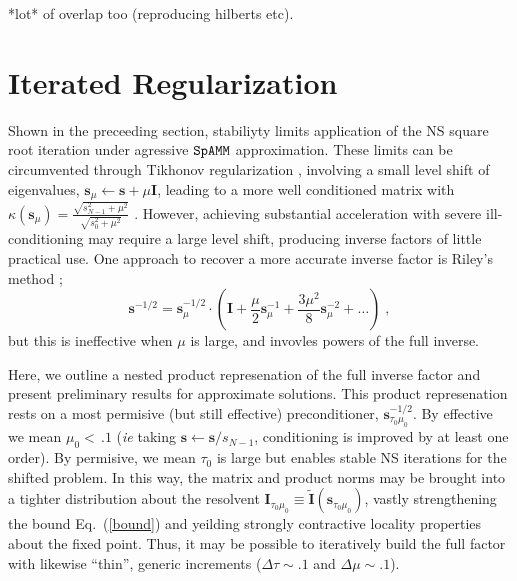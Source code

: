 \documentclass[letterpaper,twocolumn,amsmath,amsfont,amssymb,english,aps,jcp,preprintnumbers,groupaddress,nofootinbib,tightenlines,floatfix]{revtex4}
\newcommand{\mat}[1]{\boldsymbol{#1}}
\theoremstyle{plain}
\theoremstyle{remark}
\theoremstyle{plain}
\begin{document}
 *lot* of overlap too (reproducing hilberts etc).

\section{Iterated Regularization}

Shown in the preceeding section, stabiliyty limits application of the NS square root iteration under 
agressive $\tt SpAMM$ approximation.  These limits can be circumvented through Tikhonov regularization \cite{}, 
involving a small level shift of eigenvalues,  $\mat{s}_\mu \leftarrow \mat{s}+\mu \mat{I}$, leading to a more 
well conditioned matrix with $\kappa( \mat{s}_\mu) = \frac{\sqrt{s^2_{N-1} + \mu^2}}{\sqrt{s^2_0+\mu^2}}$ \cite{}.  
However, achieving substantial acceleration with severe ill-conditioning  may require a large level shift, 
producing inverse factors of little practical use.  One approach to recover a more accurate inverse
factor is Riley's method \cite{}; 
\begin{equation}
\mat{s}^{-1/2} = \mat{s}^{-1/2}_{\mu} \cdot \left( \mat{I}+\frac{\mu}{2} \mat{s}^{-1}_{\mu}
                                                   +\frac{3 \mu^2}{8} \mat{s}^{-2}_{\mu} + \dots
   \right) \; ,
\end{equation}
but this is ineffective when $\mu$ is large, and invovles powers of the full inverse. 

Here, we outline a nested product represenation of the full inverse factor and present preliminary 
results for  approximate solutions. 
This product represenation rests on a most permisive (but still effective) 
preconditioner, $\mat{s}^{-1/2}_{\tau_0 \mu_0}$. 
By effective we mean $\mu_0<\, .1$ ({\em ie} taking $\mat{s} \leftarrow \mat{s}/s_{N-1}$, conditioning is improved by at least one order). 
By permisive, we mean $\tau_0$ is large but enables stable NS iterations for the shifted problem. 
In this way, the matrix and product norms may be brought into a tighter distribution 
about the resolvent $\mat{I}_{\tau_0\mu_0}\equiv \widetilde{\mat{I}}\left(\mat{s}_{\tau_0\mu_0}\right)$,
vastly strengthening the bound  Eq.~(\ref{bound}) and yeilding strongly contractive locality properties about
the fixed point.  Thus, it may be possible to iteratively build the full factor with likewise ``thin'', generic 
increments ($\Delta \tau \sim .1$ and $\Delta \mu \sim .1$). 
\end{document}
